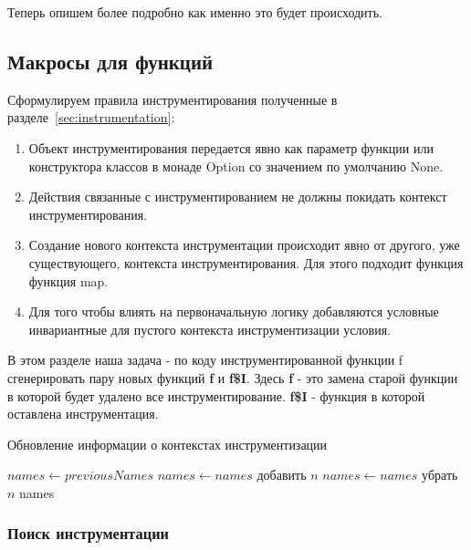 Теперь опишем более подробно как именно это будет происходить.

\subsection{Макросы для функций}
\label{sec:macroFunction}

Сформулируем правила инструментирования полученные в
разделе~\ref{sec:instrumentation}:
\begin{enumerate}
  \item
  \label{itm:ins-constructor}
  Объект инструментирования передается явно как параметр функции или
  конструктора классов в монаде Option со значением по умолчанию None.
  \item
  \label{itm:ins-context}
  Действия связанные с инструментированием не должны покидать контекст
  инструментирования.
  \item
  \label{itm:ins-creating}
  Создание нового контекста инструментации происходит явно от другого,
  уже существующего, контекста инструментирования.
  Для этого подходит функция функция map.
  \item
  \label{itm:ins-logic}
  Для того чтобы влиять на первоначальную логику добавляются условные
  инвариантные для пустого контекста инструментизации условия.
\end{enumerate}



В этом разделе наша задача - по коду инструментированной функции f сгенерировать
пару новых функций \textbf{f} и \textbf{f\$I}.
Здесь \textbf{f} - это замена старой функции в которой будет удалено
все инструментирование.
\textbf{f\$I} - функция в которой оставлена инструментация.

\begin{algorithm}
  \caption{Обновление информации о контекстах инструментизации}\label{alg:names}
  \begin{algorithmic}[1]
    \State $names \gets previousNames$
    \State $names \gets names$ добавить $n$
    \State $names \gets names$ убрать $n$
    \EndIf
    \EndFor
    \State \Return names
    \EndFunction
  \end{algorithmic}
\end{algorithm}

\subsubsection{Поиск инструментации}

